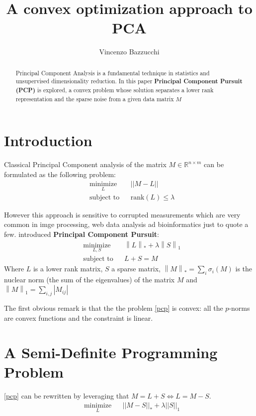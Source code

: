\documentclass[a4paper]{article}
\newcommand\norm[2]{\left\lVert#1\right\rVert _{#2}}
\begin{document}
	\title{A convex optimization approach to PCA}
	\author{Vincenzo Bazzucchi}
	\maketitle

\begin{abstract}
Principal Component Analysis is a fundamental technique in statistics and unsupervised dimensionality reduction. In this paper \textbf{Principal Component Pursuit (PCP)} is explored, a convex problem whose solution separates a lower rank representation and the sparse noise from a given data matrix $M$
\end{abstract}

\section{Introduction}
Classical Principal Component analysis of the matrix $M\in \mathds{R}^{n \times m}$ can be formulated as the following problem:
\begin{equation}
\begin{aligned}
& \underset{L}{\text{minimize}}
& & ||M-L|| \\
& \text{subject to}
& & \text{rank}(L) \leq \lambda
\end{aligned}
\end{equation}

However this approach is sensitive to corrupted measurements which are very common in imge processing, web data analysis ad bioinformatics just to quote a few.
\cite{RPCA} introduced \textbf{Principal Component Pursuit}:
\begin{equation}
\label{pcp}
\begin{aligned}
& \underset{L, S}{\text{minimize}}
& & \norm{L}{*} + \lambda\norm{S}{1} \\
& \text{subject to}
& & L + S = M
\end{aligned}
\end{equation}
Where $L$ is a lower rank matrix, $S$ a sparse matrix, $\norm{M}{*} = \sum_i \sigma_i(M)$ is the nuclear norm (the sum of the eigenvalues) of the matrix $M$ and $\norm{M}{1} = \sum_{i,j} |M_{ij}|$

The first obvious remark is that the the problem \ref{pcp} is convex: all the $p$-norms are convex functions and the constraint is linear.

\section{A Semi-Definite Programming Problem}
\ref{pcp} can be rewritten by leveraging that $M = L + S \Leftrightarrow L = M - S$.
\begin{equation}
\label{pcp1var}
\begin{aligned}
& \underset{L}{\text{minimize}}
& & ||M - S||_* + \lambda||S||_1 \\
\end{aligned}
\end{equation}
\end{document}
